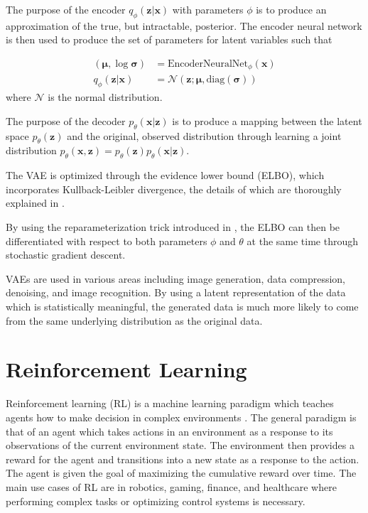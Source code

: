 The purpose of the encoder $q_\phi(\boldsymbol{z}|\boldsymbol{x})$ with parameters $\phi$ is to produce an approximation of the true, but intractable, posterior.
The encoder neural network is then used to produce the set of parameters for latent variables such that

\begin{align}
	(\boldsymbol{\mu}, \log \boldsymbol{\sigma}) &= \text{EncoderNeuralNet}_\phi (\boldsymbol{x})\\
	q_\phi(\boldsymbol{z}|\boldsymbol{x}) &= \mathcal{N}(\boldsymbol{z}; \boldsymbol{\mu}, \text{diag}(\boldsymbol{\sigma}))
\end{align}
where $\mathcal{N}$ is the normal distribution.

The purpose of the decoder $p_\theta (\boldsymbol{x}|\boldsymbol{z})$ is to produce a mapping between the latent space $p_\theta (\boldsymbol{z})$ and the original, observed distribution through learning a joint distribution $p_\theta (\boldsymbol{x}, \boldsymbol{z}) = p_\theta (\boldsymbol{z})p_\theta (\boldsymbol{x}|\boldsymbol{z})$.

The VAE is optimized through the evidence lower bound (ELBO), which incorporates Kullback-Leibler divergence, the details of which are thoroughly explained in \cite{kingma2019introduction}.

By using the reparameterization trick introduced in \cite{kingma2013auto}, the ELBO can then be differentiated with respect to both parameters $\phi$ and $\theta$ at the same time through stochastic gradient descent.

VAEs are used in various areas including image generation, data compression, denoising, and image recognition.
By using a latent representation of the data which is statistically meaningful, the generated data is much more likely to come from the same underlying distribution as the original data.

\section{Reinforcement Learning}

Reinforcement learning (RL) is a machine learning paradigm which teaches agents how to make decision in complex environments \cite{tavakol2022dic}.
The general paradigm is that of an agent which takes actions in an environment as a response to its observations of the current environment state.
The environment then provides a reward for the agent and transitions into a new state as a response to the action.
The agent is given the goal of maximizing the cumulative reward over time.
The main use cases of RL are in robotics, gaming, finance, and healthcare where performing complex tasks or optimizing control systems is necessary.

